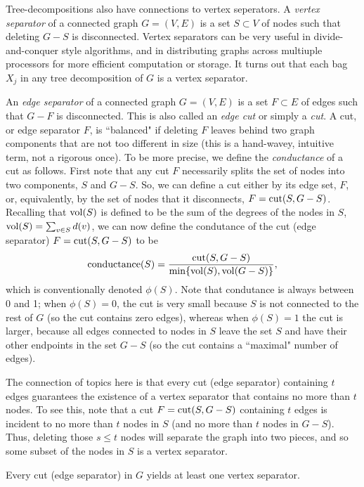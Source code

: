 Tree-decompositions also have connections to vertex seperators. A \emph{vertex separator} of a connected graph $G = (V,E)$ is a set $S \subset V$ of nodes such that deleting $G - S$ is disconnected.
Vertex separators can be very useful in divide-and-conquer style algorithms, and in distributing graphs across multiuple processors for more efficient computation or storage.
It turns out that each bag $X_j$ in any tree decomposition of $G$ is a vertex separator.

An \emph{edge separator} of a connected graph $G = (V,E)$ is a set $F\subset E$ of edges such that $G-F$ is disconnected. This is also called an \emph{edge cut} or simply a \emph{cut}.
A cut, or edge separator $F$, is ``balanced" if deleting $F$ leaves behind two graph components that are not too different in size (this is a hand-wavey, intuitive term, not a rigorous once). To be more precise, we define the \emph{conductance} of a cut as follows. First note that any cut $F$ necessarily splits the set of nodes into two components,  $S$ and $G-S$. So, we can define a cut either by its edge set, $F$, or, equivalently, by the set of nodes that it disconnects, $F = \operatorname{cut}(S,G-S)$. Recalling that $\operatorname{vol}(S)$ is defined to be the sum of the degrees of the nodes in $S$, $\operatorname{vol}(S) = \sum_{v \in S} d(v)$, we can now define the condutance of the cut (edge separator) $F = \operatorname{cut}(S,G-S)$ to be
\begin{equation}\label{eqn:def:conductance}
  \text{conductance}(S) = \frac{\operatorname{cut}(S,G-S)}{\min\{ \operatorname{vol}(S), \operatorname{vol}(G-S) \} },
\end{equation}
which is conventionally denoted $\phi(S)$.
Note that condutance is always between 0 and 1; when $\phi(S) = 0$, the cut is very small because $S$ is not connected to the rest of $G$ (so the cut contains zero edges), whereas when $\phi(S) = 1$ the cut is larger, because all edges connected to nodes in $S$ leave the set $S$ and have their other endpoints in the set $G-S$ (so the cut contains a ``maximal" number of edges).

The connection of topics here is that every cut (edge separator) containing $t$ edges guarantees the existence of a vertex separator that contains no more than $t$ nodes. To see this, note that a cut $F = \operatorname{cut}(S,G-S)$ containing $t$ edges is incident to no more than $t$ nodes in $S$ (and no more than $t$ nodes in $G-S$). Thus, deleting those $s \leq t$ nodes will separate the graph into two pieces, and so some subset of the nodes in $S$ is a vertex separator.

\begin{proposition}
  Every cut (edge separator) in $G$ yields at least one vertex separator.
\end{proposition}

